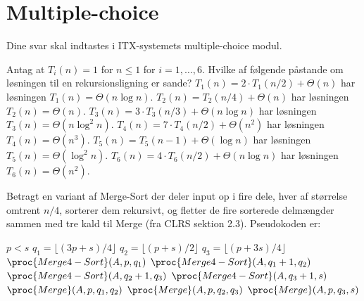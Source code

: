 \section*{Multiple-choice}\label{sec:mc}

Dine svar skal indtastes i ITX-systemets multiple-choice modul.

\multiplechoicestart

Antag at $T_i(n)=1$ for $n \leq 1$ for $i=1,\dots,6$. Hvilke af følgende påstande om løsningen til en rekursionsligning er sande?
\fleresvar
\mulighederstart
\svar $T_1(n) = 2\cdot T_1(n/2) + \Theta(n)$ har løsningen $T_1(n) = \Theta(n \log n)$. \korrekt
\svar $T_2(n) = T_2(n/4) + \Theta(n)$ har løsningen $T_2(n) = \Theta(n)$. \korrekt
\svar $T_3(n) = 3\cdot T_3(n/3) + \Theta(n \log n)$ har løsningen $T_3(n) = \Theta(n \log^2 n)$. \korrekt
\svar $T_4(n) = 7\cdot T_4(n/2) + \Theta(n^2)$ har løsningen $T_4(n) = \Theta(n^3)$.
\svar $T_5(n) = T_5(n-1) + \Theta(\log n)$ har løsningen $T_5(n) = \Theta(\log^2 n)$.
\svar $T_6(n) = 4\cdot T_6(n/2) + \Theta(n \log n)$ har løsningen $T_6(n) = \Theta(n^2)$. \korrekt
\mulighederslut



Betragt en variant af {\sc Merge-Sort} der deler input op i fire dele, hver af størrelse omtrent $n/4$, sorterer dem rekursivt, og fletter de fire sorterede delmængder sammen med tre kald til {\sc Merge} (fra CLRS sektion 2.3). Pseudokoden er:

{\small\begin{codebox}
  \li \If $p<s$ \Do
  \li $q_1 = \lfloor (3p+s)/4\rfloor$
  \li $q_2 = \lfloor (p+s)/2\rfloor$
  \li $q_3 = \lfloor (p+3s)/4\rfloor$
  \li $\proc{Merge4-Sort}(A, p, q_1)$
  \li $\proc{Merge4-Sort}(A, q_1+1, q_2)$
  \li $\proc{Merge4-Sort}(A, q_2+1, q_3)$
  \li $\proc{Merge4-Sort}(A, q_3+1, s)$
  \li $\proc{Merge}(A, p, q_1, q_2)$
  \li $\proc{Merge}(A, p, q_2, q_3)$
  \li $\proc{Merge}(A, p, q_3, s)$ \End
\end{codebox}}

